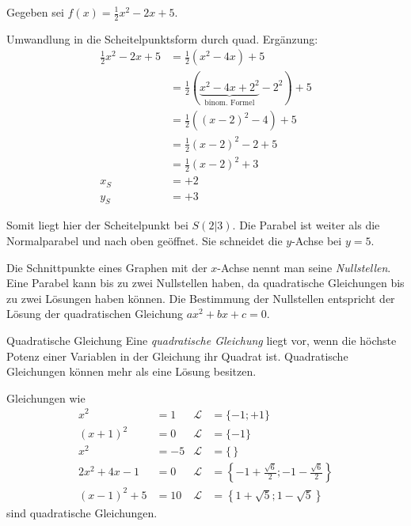 \begin{bsp}
 Gegeben sei \(f(x)=\frac{1}{2}x^2-2x+5\).
 
 Umwandlung in die Scheitelpunktsform durch quad. Ergänzung: 
 \begin{align*}
  \frac{1}{2}x^2 -2x +5 &= \frac{1}{2}\left(x^2 -4x \right) +5 \\
  &= \frac{1}{2} \left(\underbrace{x^2 -4x + 2^2}_{\text{binom. Formel}} -2^2\right) +5 \\
  &= \frac{1}{2} \left((x-2)^2 -4\right) +5 \\
  &= \frac{1}{2} (x-2)^2 -2 +5 \\
  &= \frac{1}{2} (x-2)^2 +3 \\
  x_S &= +2 \\
  y_S &= +3
 \end{align*}

 Somit liegt hier der Scheitelpunkt bei \(S(2|3)\). Die Parabel ist weiter als die Normalparabel und nach oben geöffnet. Sie schneidet die \(y\)-Achse bei \(y=5\).
\end{bsp}

\begin{beme}[Nullstellen]
 Die Schnittpunkte eines Graphen mit der \(x\)-Achse nennt man seine \emph{Nullstellen}. Eine Parabel kann bis zu zwei Nullstellen haben, da quadratische Gleichungen bis zu zwei Lösungen haben können. Die Bestimmung der Nullstellen entspricht der Lösung der quadratischen Gleichung \(ax^2+bx+c =0\).
\end{beme}

\begin{defi}{Quadratische Gleichung}
 Eine \emph{quadratische Gleichung} liegt vor, wenn die höchste Potenz einer Variablen in der Gleichung ihr Quadrat ist. Quadratische Gleichungen können mehr als eine Lösung besitzen.
 
 Gleichungen wie
 \begin{align*}
  x^2 &= 1 & \mathcal{L}&=\lbrace -1; +1\rbrace\\
  (x+1)^2 &= 0 & \mathcal{L} &= \lbrace -1 \rbrace \\
  x^2 &= -5 & \mathcal{L}&= \lbrace \,\rbrace \\
  2x^2+4x-1 &= 0 & \mathcal{L} &= \left\lbrace -1+\frac{\sqrt{6}}{2}; -1-\frac{\sqrt{6}}{2}\right\rbrace \\
  (x-1)^2+5 &= 10 & \mathcal{L} &= \left\lbrace 1+\sqrt{5};1-\sqrt{5}\right\rbrace   
 \end{align*}
 sind quadratische Gleichungen.
\end{defi}

